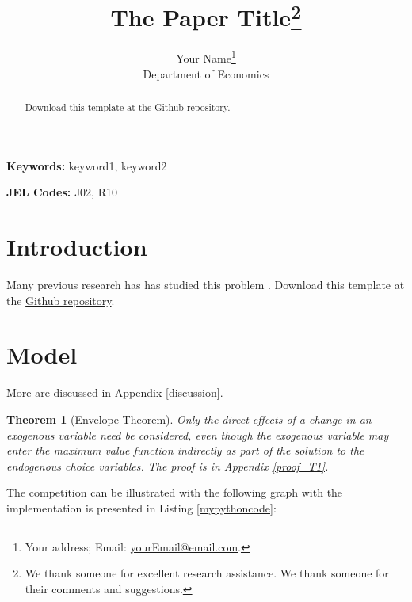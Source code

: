 \documentclass[11pt, letterpaper]{article}
\title{The Paper Title\thanks{We thank someone for excellent research assistance. We thank someone for their comments and suggestions.}}
\author{Your Name\thanks{Your address; Email: \href{mailto:yourEmail@email.com}{yourEmail@email.com}.}\\
Department of Economics}
\date{\the\year{}}
\newtheorem{theorem}{Theorem}
\begin{document}
\maketitle

\doublespacing

\begin{abstract}
  \lipsum[3] Download this template at the \href{https://github.com/howardhsumail/Paper-LaTeX-Template.git}{Github repository}.
\end{abstract}
\bigskip\bigskip

\providecommand{\key}[1]{\textbf{Keywords:} #1}
\key{keyword1, keyword2}

\providecommand{\jel}[2]{\textbf{JEL Codes:} #1}
\jel{J02, R10}

\newpage
\section{Introduction}
\lipsum[4-5] Many previous research has has studied this problem \citep{Lee2018, DS2018}. Download this template at the \href{https://github.com/howardhsumail/Paper-LaTeX-Template.git}{Github repository}.

\section{Model}
\lipsum[105-106] More are discussed in Appendix \ref{discussion}.

\begin{theorem}[Envelope Theorem]
  Only the direct effects of a change in an exogenous variable need be considered, even though the exogenous variable may enter the maximum value function indirectly as part of the solution to the endogenous choice variables. The proof is in Appendix \ref{proof_T1}.
\end{theorem}

The {\color{mycolor}competition} can be illustrated with the following graph with the implementation is presented in Listing \ref{mypythoncode}:
\end{document}
